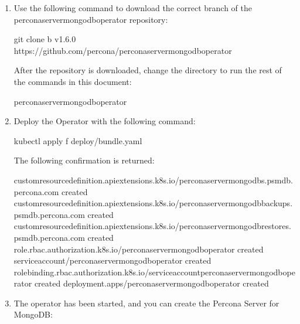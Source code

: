 \documentclass[letterpaper,10pt,english]{sphinxmanual}
\begin{document}
\begin{enumerate}
\item {} 
Use the following  command to download the correct branch of the percona\sphinxhyphen{}server\sphinxhyphen{}mongodb\sphinxhyphen{}operator repository:

\begin{sphinxVerbatim}[commandchars=\\\{\}]
git clone \PYGZhy{}b v1.6.0 https://github.com/percona/percona\PYGZhy{}server\PYGZhy{}mongodb\PYGZhy{}operator
\end{sphinxVerbatim}

After the repository is downloaded, change the directory to run the rest of the commands in this document:

\begin{sphinxVerbatim}[commandchars=\\\{\}]
 percona\PYGZhy{}server\PYGZhy{}mongodb\PYGZhy{}operator
\end{sphinxVerbatim}

\item {} 
Deploy the Operator with the following command:

\begin{sphinxVerbatim}[commandchars=\\\{\}]
kubectl apply \PYGZhy{}f deploy/bundle.yaml
\end{sphinxVerbatim}

The following confirmation is returned:

\begin{sphinxVerbatim}[commandchars=\\\{\}]
customresourcedefinition.apiextensions.k8s.io/perconaservermongodbs.psmdb.percona.com created
customresourcedefinition.apiextensions.k8s.io/perconaservermongodbbackups.psmdb.percona.com created
customresourcedefinition.apiextensions.k8s.io/perconaservermongodbrestores.psmdb.percona.com created
role.rbac.authorization.k8s.io/percona\PYGZhy{}server\PYGZhy{}mongodb\PYGZhy{}operator created
serviceaccount/percona\PYGZhy{}server\PYGZhy{}mongodb\PYGZhy{}operator created
rolebinding.rbac.authorization.k8s.io/service\PYGZhy{}account\PYGZhy{}percona\PYGZhy{}server\PYGZhy{}mongodb\PYGZhy{}operator created
deployment.apps/percona\PYGZhy{}server\PYGZhy{}mongodb\PYGZhy{}operator created
\end{sphinxVerbatim}

\item {} 
The operator has been started, and you can create the Percona Server for MongoDB:


\end{enumerate}
\end{document}
